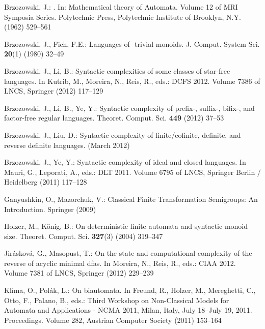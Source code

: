 \documentclass{llncs}
\begin{document}
\newpage



\providecommand{\noopsort}[1]{}
\begin{thebibliography}{10}

Brzozowski, J.:
.
\newblock In: Mathematical theory of Automata. Volume 12 of MRI Symposia
  Series.
\newblock Polytechnic Press, Polytechnic Institute of Brooklyn, N.Y. (1962)
  529--561

Brzozowski, J., Fich, F.E.:
\newblock Languages of {}-trivial monoids.
\newblock J. Comput. System Sci. \textbf{20}(1) (1980)  32--49

Brzozowski, J., Li, B.:
\newblock Syntactic complexities of some classes of star-free languages.
\newblock In Kutrib, M., Moreira, N., Reis, R., eds.: DCFS 2012. Volume 7386 of
  LNCS, Springer (2012)  117--129

Brzozowski, J., Li, B., Ye, Y.:
\newblock Syntactic complexity of prefix-, suffix-, bifix-, and factor-free
  regular languages.
\newblock Theoret. Comput. Sci. \textbf{449} (2012)  37--53

Brzozowski, J., Liu, D.:
\newblock Syntactic complexity of finite/cofinite, definite, and reverse
  definite languages.
 (March 2012)

Brzozowski, J., Ye, Y.:
\newblock Syntactic complexity of ideal and closed languages.
\newblock In Mauri, G., Leporati, A., eds.: DLT 2011. Volume 6795 of LNCS,
  Springer Berlin / Heidelberg (2011)  117--128

Ganyushkin, O., Mazorchuk, V.:
\newblock Classical Finite Transformation Semigroups: An Introduction.
\newblock Springer (2009)

Holzer, M., K\"{o}nig, B.:
\newblock On deterministic finite automata and syntactic monoid size.
\newblock Theoret. Comput. Sci. \textbf{327}(3) (2004)  319--347

Jir{\'a}skov{\'a}, G., Masopust, T.:
\newblock On the state and computational complexity of the reverse of acyclic
  minimal dfas.
\newblock In Moreira, N., Reis, R., eds.: CIAA 2012. Volume 7381 of LNCS,
  Springer (2012)  229--239

Kl\'{\i}ma, O., Pol{\'a}k, L.:
\newblock On biautomata.
\newblock In Freund, R., Holzer, M., Mereghetti, C., Otto, F., Palano, B.,
  eds.: Third Workshop on Non-Classical Models for Automata and Applications -
  NCMA 2011, Milan, Italy, July 18--July 19, 2011. Proceedings. Volume 282,
  Austrian Computer Society (2011)  153--164


\end{thebibliography}
\end{document}
